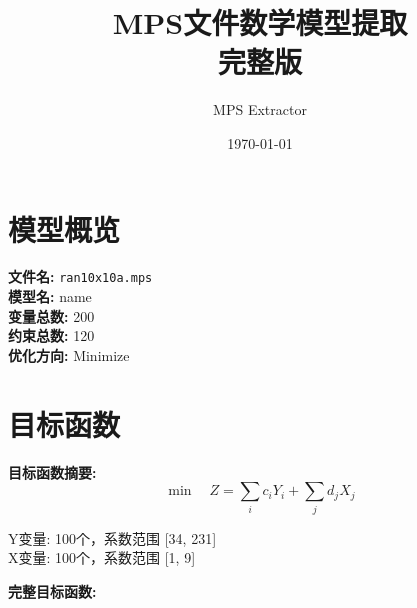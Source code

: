 \documentclass[a4paper,10pt]{article}
\title{MPS文件数学模型提取\\{\large 完整版}}
\author{MPS Extractor}
\date{\today}
\begin{document}
\maketitle
\tableofcontents
\newpage

\section{模型概览}

\textbf{文件名:} \texttt{ran10x10a.mps} \\
\textbf{模型名:} name \\
\textbf{变量总数:} 200 \\
\textbf{约束总数:} 120 \\
\textbf{优化方向:} Minimize \\

\section{目标函数}

\textbf{目标函数摘要:}
\begin{equation}
\min \quad Z = \sum_{i} c_i Y_i + \sum_{j} d_j X_j
\end{equation}

Y变量: 100个，系数范围 [34, 231] \\
X变量: 100个，系数范围 [1, 9]

\textbf{完整目标函数:}
\end{document}
